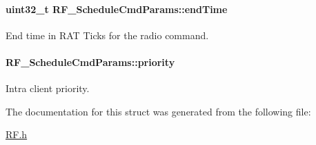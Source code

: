 \paragraph[{end\+Time}]{\setlength{\rightskip}{0pt plus 5cm}uint32\+\_\+t R\+F\+\_\+\+Schedule\+Cmd\+Params\+::end\+Time}\label{struct_r_f___schedule_cmd_params_ae4244a807352c8c93def2d39bbbd080e}


End time in R\+A\+T Ticks for the radio command. 

\paragraph[{priority}]{ R\+F\+\_\+\+Schedule\+Cmd\+Params\+::priority}\label{struct_r_f___schedule_cmd_params_a809078fc59bdf91f81ef390da0047537}


Intra client priority. 



The documentation for this struct was generated from the following file\+:\begin{DoxyCompactItemize}
\item 
\hyperlink{_r_f_8h}{R\+F.\+h}\end{DoxyCompactItemize}
